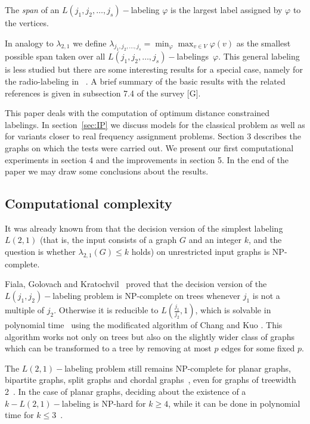 \documentclass[smallextended]{svjour3}
\begin{document}
The \emph{span} of an $L(j_1,j_2,\ldots ,j_{s})-$labeling 
$\varphi$ is the largest label assigned by $\varphi$ to the vertices. 

In analogy to $\lambda_{2,1}$ we define $\lambda_{j_1,j_2,\ldots ,j_{s}}=\min_{\varphi}\max_{v\in V}\varphi(v)$ as the smallest possible span taken over all $L(j_1,j_2,\ldots ,j_{s})-$labelings~$\varphi$. 
This general labeling is less studied but there are some interesting results for a special case, 
namely for the radio-labeling in ~\cite{CEHZ,L,LMZ,HT}. A brief summary of the basic results with the related references is given in subsection 7.4 of the survey [G].

This paper deals with the computation of optimum distance constrained labelings. 
In section~\ref{sec:IP} we discuss models for the classical problem as 
well as for variants closer to real frequency assignment problems. Section 3 describes the graphs on which the tests were carried out. We present our first computational experiments in section 4 and the improvements in section 5. In the end of the paper we may draw some conclusions about the results.




\subsection{Computational complexity} 

It was already known from \cite{GY92} that the decision version of the simplest labeling $L(2,1)$ (that is, the input consists of a graph $G$ and an integer $k$, and the question is whether $\lambda_{2,1}(G)\leq k$ holds) on unrestricted input graphs is NP-complete. 

Fiala, Golovach and Kratochvil~\cite{7} proved that the decision version of the $L(j_{1},j_{2})-$labeling problem is NP-complete on trees whenever $j_{1}$ is not a multiple of $j_{2}$. Otherwise it is reducible to $L(\frac{j_{1}}{j_{2}},1)$, which is solvable in polynomial time~\cite{8} using the modificated algorithm of Chang and Kuo \cite{9}. This algorithm works not only on trees but also on the slightly wider class of graphs which can be transformed to a tree by removing at most $p$ edges for some fixed $p$. 

The $L(2,1)-$labeling problem still remains NP-complete for planar graphs, bipartite graphs, split graphs and chordal graphs~\cite{10}, even for graphs of treewidth 2~\cite{11}. In the case of planar graphs, deciding about the existence of a $k-L(2,1)-$labeling is NP-hard for $k\geq4$, while it can be done in polynomial time for $k\leq3$~\cite{12}. 
\end{document}
